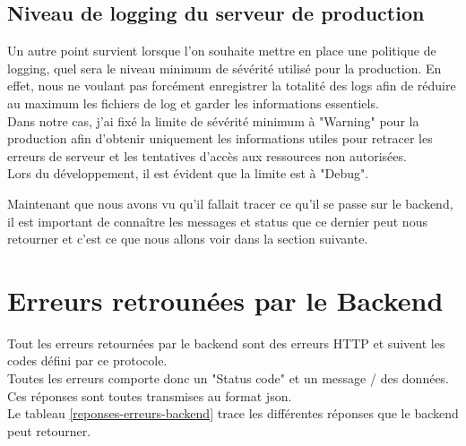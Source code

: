 \documentclass[
    iai, %
    il, %
]{heig-tb}
\begin{document}
\subsection{Niveau de logging du serveur de production}
Un autre point survient lorsque l'on souhaite mettre en place une politique de logging, quel sera le niveau minimum de sévérité utilisé pour la production. En effet, nous ne voulant pas forcément enregistrer la totalité des logs afin de réduire au maximum les fichiers de log et garder les informations essentiels. \\
Dans notre cas, j'ai fixé la limite de sévérité minimum à "Warning" pour la production afin d'obtenir uniquement les informations utiles pour retracer les erreurs de serveur et les tentatives d'accès aux ressources non autorisées. \\
Lors du développement, il est évident que la limite est à "Debug".

Maintenant que nous avons vu qu'il fallait tracer ce qu'il se passe sur le \Gls{backend}, il est important de connaître les messages et status que ce dernier peut nous retourner et c'est ce que nous allons voir dans la section suivante.

\section{Erreurs retrounées par le Backend}
Tout les erreurs retournées par le \Gls{backend} sont des erreurs HTTP et suivent les codes défini par ce protocole. \\
Toutes les erreurs comporte donc un "Status code" et un message / des données. Ces réponses sont toutes transmises au format \Gls{json}. \\
Le tableau \ref{reponses-erreurs-backend} trace les différentes réponses que le \Gls{backend} peut retourner.
\end{document}
